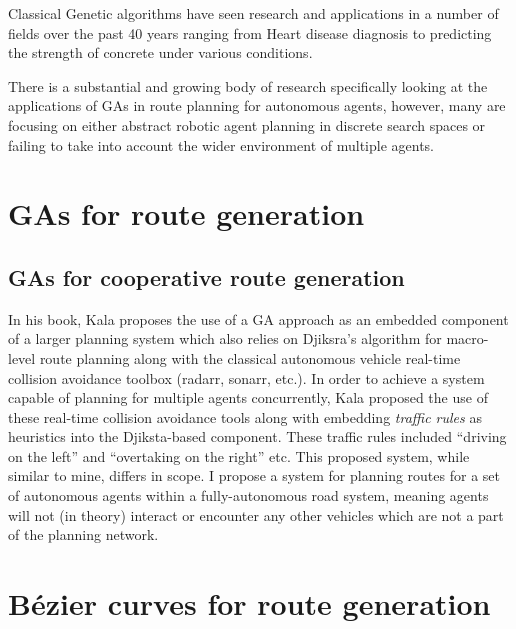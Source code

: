 

Classical Genetic algorithms have seen research and applications in a number of fields over the past 40 years ranging from Heart disease diagnosis\cite{reddyHybridGeneticAlgorithm2020} to predicting the strength of concrete under various conditions\cite{shariatiPredictionConcreteStrength2020}.

There is a substantial and growing body of research specifically looking at the applications of GAs in route planning for autonomous agents, however, many are focusing on either abstract robotic agent planning in discrete search spaces or failing to take into account the wider environment of multiple agents.

\section{GAs for route generation}


\subsection{GAs for cooperative route generation}

In his book, Kala \cite{kalaOptimizationBasedPlanning2016} proposes the use of a GA approach as an embedded component of a larger planning system which also relies on Djiksra's algorithm for macro-level route planning along with the classical autonomous vehicle real-time collision avoidance toolbox (radarr, sonarr, etc.). In order to achieve a system capable of planning for multiple agents concurrently, Kala proposed the use of these real-time collision avoidance tools along with embedding \textit{traffic rules} as heuristics into the Djiksta-based component. These traffic rules included ``driving on the left'' and ``overtaking on the right'' etc. This proposed system, while similar to mine, differs in scope. I propose a system for planning routes for a set of autonomous agents within a fully-autonomous road system, meaning agents will not (in theory) interact or encounter any other vehicles which are not a part of the planning network.



\section{Bézier curves for route generation}

